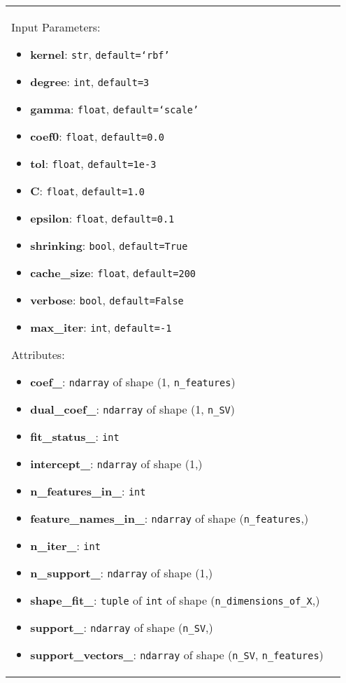\begin{longtable}{|l|p{12cm}|}
    Input Parameters:
    \begin{itemize}
        \item \textbf{kernel}: \texttt{str}, \texttt{default=`rbf'}
        \item \textbf{degree}: \texttt{int}, \texttt{default=3}
        \item \textbf{gamma}: \texttt{float}, \texttt{default=`scale'}
        \item \textbf{coef0}: \texttt{float}, \texttt{default=0.0}
        \item \textbf{tol}: \texttt{float}, \texttt{default=1e-3}
        \item \textbf{C}: \texttt{float}, \texttt{default=1.0}
        \item \textbf{epsilon}: \texttt{float}, \texttt{default=0.1}
        \item \textbf{shrinking}: \texttt{bool}, \texttt{default=True}
        \item \textbf{cache\_size}: \texttt{float}, \texttt{default=200}
        \item \textbf{verbose}: \texttt{bool}, \texttt{default=False}
        \item \textbf{max\_iter}: \texttt{int}, \texttt{default=-1}
    \end{itemize}

    Attributes:
    \begin{itemize}
        \item \textbf{coef\_}: \texttt{ndarray} of shape (1, \texttt{n\_features})
        \item \textbf{dual\_coef\_}: \texttt{ndarray} of shape (1, \texttt{n\_SV})
        \item \textbf{fit\_status\_}: \texttt{int}
        \item \textbf{intercept\_}: \texttt{ndarray} of shape (1,)
        \item \textbf{n\_features\_in\_}: \texttt{int}
        \item \textbf{feature\_names\_in\_}: \texttt{ndarray} of shape (\texttt{n\_features},)
        \item \textbf{n\_iter\_}: \texttt{int}
        \item \textbf{n\_support\_}: \texttt{ndarray} of shape (1,)
        \item \textbf{shape\_fit\_}: \texttt{tuple} of \texttt{int} of shape (\texttt{n\_dimensions\_of\_X},)
        \item \textbf{support\_}: \texttt{ndarray} of shape (\texttt{n\_SV},)
        \item \textbf{support\_vectors\_}: \texttt{ndarray} of shape (\texttt{n\_SV}, \texttt{n\_features})
    \end{itemize}


\end{longtable}

